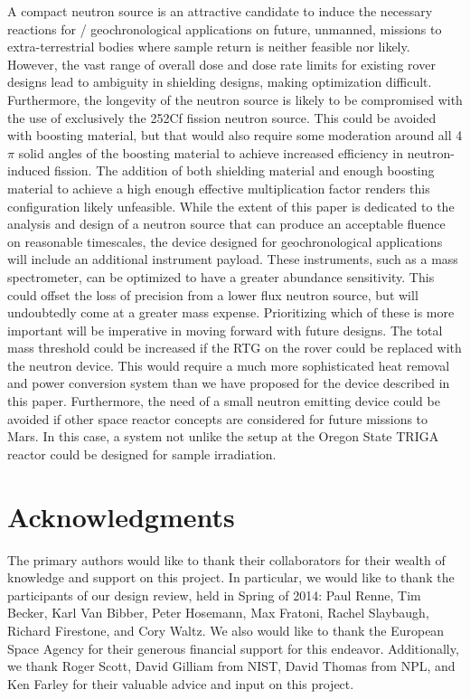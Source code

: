 \documentclass{mc2015}
\begin{document}
A compact neutron source is an attractive candidate to induce the necessary reactions for  /  geochronological applications on future, unmanned, missions to extra-terrestrial bodies where sample return is neither feasible nor likely. However, the vast range of overall dose and dose rate limits for existing  rover designs lead to ambiguity in shielding designs, making optimization difficult. Furthermore, the longevity of the neutron source is likely to be compromised with the use of exclusively the 252Cf fission neutron source. This could be avoided with boosting material, but that would also require some moderation around all 4$\pi$ solid angles of the boosting material to achieve increased efficiency in neutron-induced fission. The addition of both shielding material and enough boosting material to achieve a high enough effective multiplication factor renders this configuration likely unfeasible. While the extent of this paper is dedicated to the analysis and design of a neutron source that can produce an acceptable fluence on reasonable timescales, the device designed for geochronological applications will include an additional instrument payload. These instruments, such as a mass spectrometer, can be optimized to have a greater abundance sensitivity. This could offset the loss of precision from a lower flux neutron source, but will undoubtedly come at a greater mass expense. Prioritizing which of these is more important will be imperative in moving forward with future designs. The total mass threshold could be increased if the RTG on the rover could be replaced with the neutron device. This would require a much more sophisticated heat removal and power conversion system than we have proposed for the device described in this paper. Furthermore, the need of a small neutron emitting device could be avoided if other space reactor concepts are considered for future missions to Mars. In this case, a system not unlike the setup at the Oregon State TRIGA reactor could be designed for sample irradiation. 

\section{Acknowledgments}

The primary authors would like to thank their collaborators for their wealth of knowledge and support on this project. In particular, we would like to thank the participants of our design review, held in Spring of 2014: Paul Renne, Tim Becker, Karl Van Bibber, Peter Hosemann, Max Fratoni, Rachel Slaybaugh, Richard Firestone, and Cory Waltz. We also would like to thank the European Space Agency for their generous financial support for this endeavor. Additionally, we thank Roger Scott, David Gilliam from NIST, David Thomas from NPL, and Ken Farley for their valuable advice and input on this project. 

\setlength{\baselineskip}{12pt}




\end{document}
